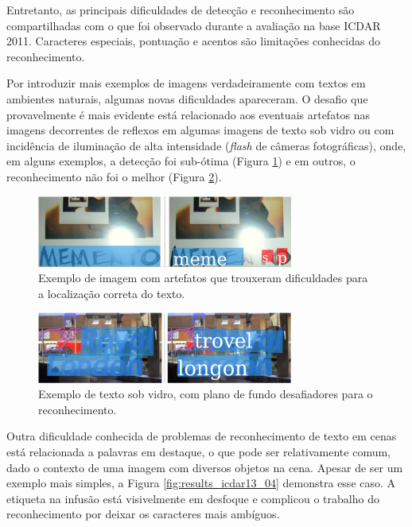 Entretanto, as principais dificuldades de detecção e reconhecimento são compartilhadas com o que foi observado durante a avaliação 
na base ICDAR 2011. Caracteres especiais, pontuação e acentos são limitações conhecidas do reconhecimento.

Por introduzir mais exemplos de imagens verdadeiramente com textos em ambientes naturais, algumas novas dificuldades apareceram. 
O desafio que provavelmente é mais evidente está relacionado aos eventuais artefatos nas imagens decorrentes de reflexos em 
algumas imagens de texto sob vidro ou com incidência de iluminação de alta intensidade (\textit{flash} de câmeras fotográficas), 
onde, em alguns exemplos, a detecção foi sub-ótima (Figura \ref{fig:results_icdar13_03}) e em outros, o reconhecimento não foi 
o melhor (Figura \ref{fig:results_icdar13_02}).

\begin{figure}
    \centering
    \includegraphics[width=0.75\textwidth]{figs/resultados-icdar13-03.png}
    \caption{Exemplo de imagem com artefatos que trouxeram dificuldades para a localização correta do texto.}
    \label{fig:results_icdar13_03}
\end{figure}

\begin{figure}
    \centering
    \includegraphics[width=0.75\textwidth]{figs/resultados-icdar13-02.png}
    \caption{Exemplo de texto sob vidro, com plano de fundo desafiadores para o reconhecimento.}
    \label{fig:results_icdar13_02}
\end{figure}

Outra dificuldade conhecida de problemas de reconhecimento de texto em cenas está relacionada a palavras em destaque, o que pode 
ser relativamente comum, dado o contexto de uma imagem com diversos objetos na cena. Apesar de ser um exemplo mais simples, a 
Figura \ref{fig:results_icdar13_04} demonstra esse caso. A etiqueta na infusão está visivelmente em desfoque e complicou o 
trabalho do reconhecimento por deixar os caracteres mais ambíguos.

